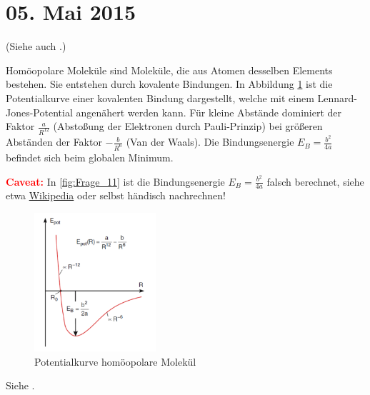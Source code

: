 \section{05. Mai 2015}

\label{q:11}

(Siehe auch .)

Homöopolare Moleküle sind Moleküle, die aus Atomen desselben Elements bestehen. Sie entstehen durch kovalente Bindungen. In Abbildung \ref{fig:Frage_11} ist die Potentialkurve einer kovalenten Bindung dargestellt, welche mit einem Lennard-Jones-Potential angenähert werden kann. Für kleine Abstände dominiert der Faktor $\frac{a}{R^{12}}$ (Abstoßung der Elektronen durch Pauli-Prinzip) bei größeren Abständen der Faktor $-\frac{b}{R^6}$ (Van der Waals). Die Bindungsenergie $E_B = \frac{b^2}{4a}$ befindet sich beim globalen Minimum.

\textcolor{red}{\textbf{Caveat:}} In \autoref{fig:Frage_11} ist die Bindungsenergie $E_B = \frac{b^2}{4a}$ falsch berechnet, siehe etwa \href{https://en.wikipedia.org/wiki/Lennard-Jones_potential#Alternative_notations_of_the_Lennard-Jones_potential}{Wikipedia} oder selbst händisch nachrechnen!

\begin{figure}[H]
    \centering
    \includegraphics[width = 0.4\textwidth]{resources/05-05-2015/Frage_11.png}
    \caption{Potentialkurve homöopolare Molekül}
    \label{fig:Frage_11}
\end{figure}


\label{q:12}

Siehe .

\label{q:13}

